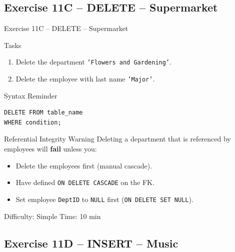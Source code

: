 \documentclass[10pt]{beamer}
\begin{document}
\subsection{Exercise 11C -- DELETE -- Supermarket}

\begin{frame}[fragile]{Exercise 11C -- DELETE -- Supermarket}
  \begin{block}{Tasks}
    \begin{enumerate}
      \item Delete the department \texttt{'Flowers and Gardening'}.
      \item Delete the employee with last name \texttt{'Major'}.
    \end{enumerate}
  \end{block}

  \begin{block}{Syntax Reminder}
\begin{lstlisting}[style=sqlstyle]
DELETE FROM table_name
WHERE condition;
\end{lstlisting}
  \end{block}

  \begin{alertblock}{Referential Integrity Warning}
    Deleting a department that is referenced by employees will \textbf{fail} unless you:
    \begin{itemize}
      \item Delete the employees first (manual cascade).
      \item Have defined \texttt{ON DELETE CASCADE} on the FK.
      \item Set employee \texttt{DeptID} to \texttt{NULL} first (\texttt{ON DELETE SET NULL}).
    \end{itemize}
  \end{alertblock}

  \begin{alertblock}{Difficulty: Simple \quad Time: 10 min}
  \end{alertblock}
\end{frame}

\subsection{Exercise 11D -- INSERT -- Music}
\end{document}

